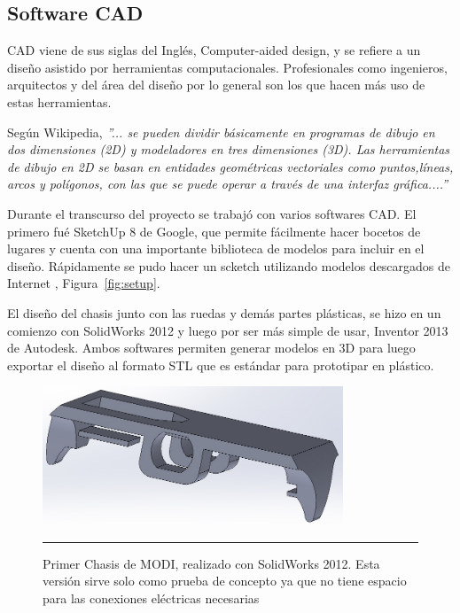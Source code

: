 \subsection{Software CAD}

CAD viene de sus siglas del Inglés, Computer-aided design, y se refiere a un diseño asistido por herramientas computacionales. Profesionales como ingenieros, arquitectos y del área del diseño por lo general son los que hacen más uso de estas herramientas.

Según Wikipedia, \textit{”... se pueden dividir básicamente en programas de dibujo en dos dimensiones (2D) y modeladores en tres dimensiones (3D). Las herramientas de dibujo en 2D se basan en entidades geométricas vectoriales como puntos,líneas, arcos y polígonos, con las que se puede operar a través de una interfaz gráfica....”}

Durante el transcurso del proyecto se trabajó con varios softwares CAD. El primero fué SketchUp 8 de Google, que permite fácilmente hacer bocetos de lugares y cuenta con una importante biblioteca de modelos para incluir en el diseño. Rápidamente se pudo hacer un scketch utilizando modelos descargados de Internet , Figura~\ref{fig:setup}.

El diseño del chasis junto con las ruedas y demás partes plásticas, se hizo en un comienzo con SolidWorks 2012 y luego por ser más simple de usar, Inventor 2013 de Autodesk. Ambos softwares permiten generar modelos en 3D para luego exportar el diseño al formato STL que es estándar para prototipar en plástico.


\begin{figure}[htbp]
	\centering
		\includegraphics[width=0.8\textwidth]{./Figures/MODI/1MODI.jpg}
		\rule{35em}{0.5pt}
	\caption[ModiSolidWorks]{Primer Chasis de MODI, realizado con SolidWorks 2012. Esta versión sirve solo como prueba de concepto ya que no tiene espacio para las conexiones eléctricas necesarias}
	\label{fig:MODISolidWork}
\end{figure}	

